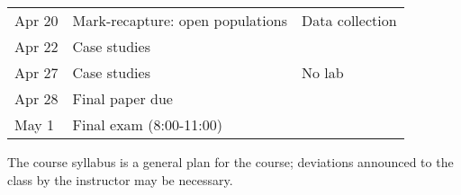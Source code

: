 \documentclass[11pt]{article}
\begin{document}
\begin{center}
\begin{tabular}[c]{lll}
\hline
Apr 20     & Mark-recapture: open populations   & Data collection                   \\
Apr 22     & Case studies                       &                                   \\
\hline
Apr 27     & Case studies                       & No lab                            \\
Apr 28     & Final paper due                    &                                   \\
\hline
May  1     & Final exam (8:00-11:00)            &                                   \\
\hline \hline
\end{tabular}
\end{center}

The course syllabus is a general plan for the course; deviations announced to the class by the instructor may be necessary.
\end{document}
